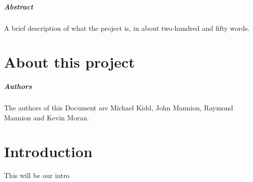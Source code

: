 
\paragraph{Abstract}
A brief description of what the project is, in about two-hundred and fifty words.

\chapter*{About this project}

\paragraph{Authors}
The authors of this Document are Michael Kidd, John Mannion, Raymond Mannion and Kevin Moran.

\chapter{Introduction}
This will be our intro